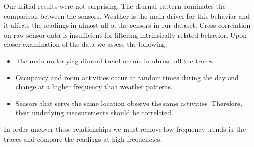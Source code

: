 Our initial results were not surprising.  The diurnal pattern dominates the comparison between the sensors.
Weather is the main driver for this behavior and it affects the readings in almost all of the
sensors in our dataset.  Cross-correlation on raw sensor data is insufficient for filtering intrinsically related
behavior.  Upon closer examination of the data we assess the following:

\begin{itemize}
\item The main underlying diurnal trend occurs in almost all the traces.
\item Occupancy and room activities occur at random times during the day and change 
		at a higher frequency than weather patterns.
\item Sensors that serve the same location observe the same activities.  Therefore, their underlying
		measurements should be correlated.
\end{itemize}

In order uncover these relationships we must remove low-frequency trends in the traces and
compare the readings at high frequencies.


